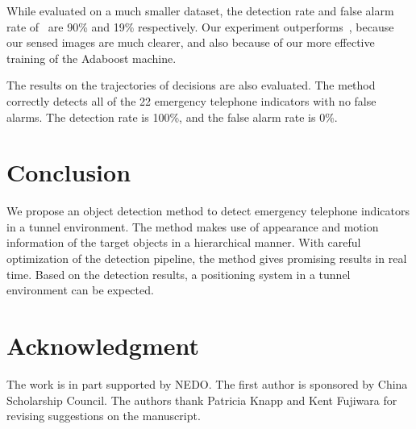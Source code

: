 \documentclass{JoITSRstyle}
\begin{document}
While evaluated on a much smaller dataset, the detection rate and false alarm rate of~\cite{wang1} are 90\% and 19\% respectively. Our experiment outperforms~\cite{wang1}, because our sensed images are much clearer, and also because of our more effective training of the Adaboost machine.

The results on the trajectories of decisions are also evaluated. The method correctly detects all of the 22 emergency telephone indicators with no false alarms. The detection rate is 100\%, and the false alarm rate is 0\%.

\section{Conclusion}
We propose an object detection method to detect emergency telephone indicators in a tunnel environment. The method makes use of appearance and motion information of the target objects in a hierarchical manner. With careful optimization of the detection pipeline, the method gives promising results in real time. Based on the detection results, a positioning system in a tunnel environment can be expected.




\section*{Acknowledgment}


The work is in part supported by NEDO. The first author is sponsored by China Scholarship Council. The authors thank Patricia Knapp and Kent Fujiwara for revising suggestions on the manuscript.




{\small


}
\end{document}
